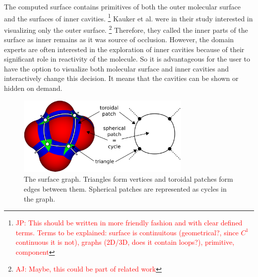 The computed surface contains primitives of both the outer molecular surface and the surfaces of inner cavities.
\footnote{\textcolor{red}{JP: This should be written in more friendly fashion and with clear defined terms.
Terms to be explained: surface is continuitous (geometrical?, since $C^1$ continuous it is not), graphs (2D/3D, does it contain loops?), primitive, component}}
Kauker et al. \cite{kauker2013rendering} were in their study interested in visualizing only the outer surface.
\footnote{\textcolor{red}{AJ: Maybe, this could be part of related work}}
Therefore, they called the inner parts of the surface as inner remains as it was source of occlusion.
However, the domain experts are often interested in the exploration of inner cavities because of their significant role in reactivity of the molecule.
So it is advantageous for the user to have the option to visualize both molecular surface and inner cavities and interactively change this decision.
It means that the cavities can be shown or hidden on demand.


\begin{figure}[htb]
  \centering
  \includegraphics[width=3.3in]{image/graph.png}
  \caption{The surface graph.
	Triangles form vertices and toroidal patches form edges between them.
	Spherical patches are represented as cycles in the graph.}
	\label{fig:graph}
\end{figure}

